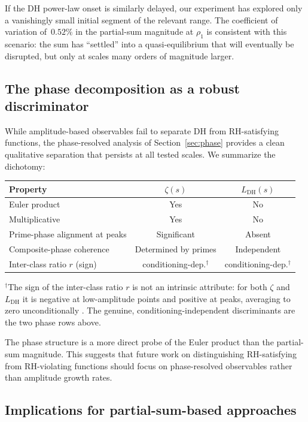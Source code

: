 \documentclass[11pt]{amsart}
\theoremstyle{definition}
\theoremstyle{remark}
\renewcommand{\DH}{\mathrm{DH}}
\begin{document}
If the DH power-law onset is similarly delayed, our experiment has
explored only a vanishingly small initial segment of the relevant
range.  The coefficient of variation of~$0.52\%$ in the partial-sum
magnitude at $\rho_1$ is consistent with this scenario: the sum has
``settled'' into a quasi-equilibrium that will eventually be disrupted,
but only at scales many orders of magnitude larger.

\subsection{The phase decomposition as a robust discriminator}

While amplitude-based observables fail to separate DH from
RH-satisfying functions, the phase-resolved analysis of
Section~\ref{sec:phase} provides a clean qualitative separation that
persists at all tested scales.  We summarize the dichotomy:

\begin{center}
\begin{tabular}{@{}lcc@{}}
\toprule
Property & $\zeta(s)$ & $L_{\DH}(s)$ \\
\midrule
Euler product        & Yes & No \\
Multiplicative       & Yes & No \\
Prime-phase alignment at peaks & Significant & Absent \\
Composite-phase coherence & Determined by primes & Independent \\
Inter-class ratio $r$ (sign) & conditioning-dep.$^\dagger$ & conditioning-dep.$^\dagger$ \\
\bottomrule
\end{tabular}
\end{center}

\noindent$^\dagger$The sign of the inter-class ratio $r$ is not an
intrinsic attribute: for both $\zeta$ and $L_{\DH}$ it is negative at
low-amplitude points and positive at peaks, averaging to zero
unconditionally \cite{TrejoSignNote}. The genuine, conditioning-independent
discriminants are the two phase rows above.

\medskip
The phase structure is a more direct probe of the Euler product than
the partial-sum magnitude.  This suggests that future work on
distinguishing RH-satisfying from RH-violating functions should focus
on phase-resolved observables rather than amplitude growth rates.

\subsection{Implications for partial-sum-based approaches}
\end{document}
